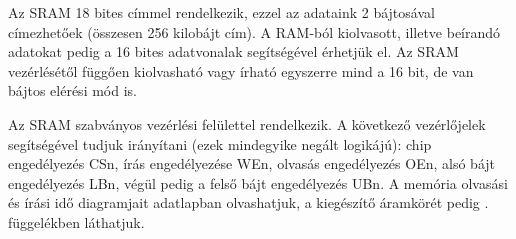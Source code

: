 	Az SRAM 18 bites címmel rendelkezik, ezzel az adataink 2 bájtosával címezhetőek (összesen 256 kilobájt cím). A RAM-ból kiolvasott, illetve beírandó adatokat pedig a 16 bites adatvonalak segítségével érhetjük el. Az SRAM vezérlésétől függően kiolvasható vagy írható egyszerre mind a 16 bit, de van bájtos elérési mód is.
	
	Az SRAM szabványos vezérlési felülettel rendelkezik. A következő vezérlőjelek segítségével tudjuk irányítani (ezek mindegyike negált logikájú): chip engedélyezés CSn, írás engedélyezése WEn, olvasás engedélyezés OEn, alsó bájt engedélyezés LBn, végül pedig a felső bájt engedélyezés UBn. A memória olvasási és írási idő diagramjait  adatlapban olvashatjuk, a kiegészítő áramkörét pedig . függelékben láthatjuk.     
	
